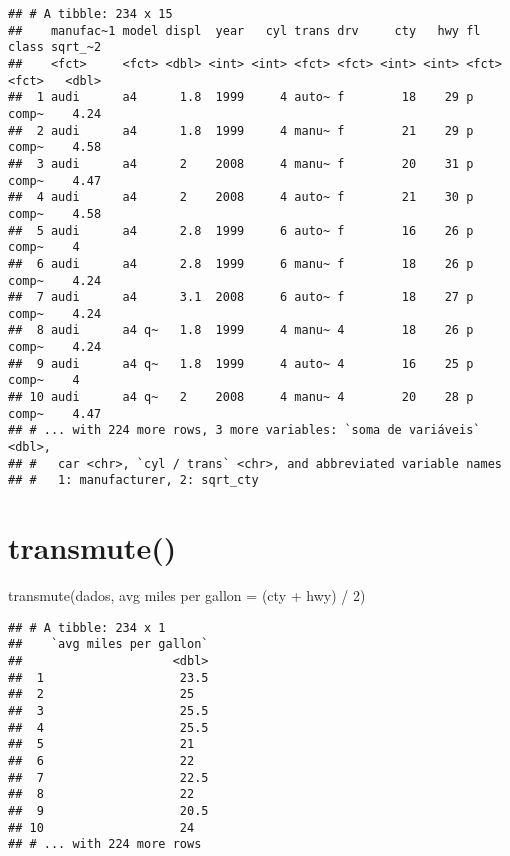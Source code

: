 \documentclass[
]{book}
\newenvironment{Shaded}{\begin{snugshade}}{\end{snugshade}}
\newcommand{\AttributeTok}[1]{\textcolor[rgb]{0.77,0.63,0.00}{#1}}
\newcommand{\DecValTok}[1]{\textcolor[rgb]{0.00,0.00,0.81}{#1}}
\newcommand{\FunctionTok}[1]{\textcolor[rgb]{0.00,0.00,0.00}{#1}}
\newcommand{\NormalTok}[1]{#1}
\newcommand{\OtherTok}[1]{\textcolor[rgb]{0.56,0.35,0.01}{#1}}
\newcommand{\SpecialCharTok}[1]{\textcolor[rgb]{0.00,0.00,0.00}{#1}}
\newcommand{\StringTok}[1]{\textcolor[rgb]{0.31,0.60,0.02}{#1}}
\begin{document}
\begin{verbatim}
## # A tibble: 234 x 15
##    manufac~1 model displ  year   cyl trans drv     cty   hwy fl    class sqrt_~2
##    <fct>     <fct> <dbl> <int> <int> <fct> <fct> <int> <int> <fct> <fct>   <dbl>
##  1 audi      a4      1.8  1999     4 auto~ f        18    29 p     comp~    4.24
##  2 audi      a4      1.8  1999     4 manu~ f        21    29 p     comp~    4.58
##  3 audi      a4      2    2008     4 manu~ f        20    31 p     comp~    4.47
##  4 audi      a4      2    2008     4 auto~ f        21    30 p     comp~    4.58
##  5 audi      a4      2.8  1999     6 auto~ f        16    26 p     comp~    4   
##  6 audi      a4      2.8  1999     6 manu~ f        18    26 p     comp~    4.24
##  7 audi      a4      3.1  2008     6 auto~ f        18    27 p     comp~    4.24
##  8 audi      a4 q~   1.8  1999     4 manu~ 4        18    26 p     comp~    4.24
##  9 audi      a4 q~   1.8  1999     4 auto~ 4        16    25 p     comp~    4   
## 10 audi      a4 q~   2    2008     4 manu~ 4        20    28 p     comp~    4.47
## # ... with 224 more rows, 3 more variables: `soma de variáveis` <dbl>,
## #   car <chr>, `cyl / trans` <chr>, and abbreviated variable names
## #   1: manufacturer, 2: sqrt_cty
\end{verbatim}

\hypertarget{transmute}{%
\section{transmute()}\label{transmute}}

\begin{Shaded}
\begin{Highlighting}[]
\FunctionTok{transmute}\NormalTok{(dados,}
          \StringTok{\textasciigrave{}}\AttributeTok{avg miles per gallon}\StringTok{\textasciigrave{}} \OtherTok{=}\NormalTok{ (cty }\SpecialCharTok{+}\NormalTok{ hwy) }\SpecialCharTok{/} \DecValTok{2}\NormalTok{)}
\end{Highlighting}
\end{Shaded}

\begin{verbatim}
## # A tibble: 234 x 1
##    `avg miles per gallon`
##                     <dbl>
##  1                   23.5
##  2                   25  
##  3                   25.5
##  4                   25.5
##  5                   21  
##  6                   22  
##  7                   22.5
##  8                   22  
##  9                   20.5
## 10                   24  
## # ... with 224 more rows
\end{verbatim}
\end{document}
